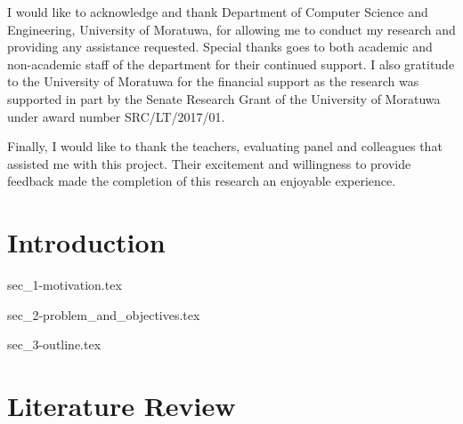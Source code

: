 \documentclass[a4paper,oneside,12pt]{report}
\begin{document}
I would like to acknowledge and thank Department of Computer Science and Engineering, University of Moratuwa, for allowing me to conduct my research and providing any assistance requested. Special thanks goes to both academic and non-academic staff of the department for their continued support. I also gratitude to the University of Moratuwa for the financial support as the research was supported in part by the Senate Research Grant of the University of Moratuwa under award number SRC/LT/2017/01.

Finally, I would like to thank the teachers, evaluating panel and colleagues that assisted me with this project. Their excitement and willingness to provide feedback made the completion of this research an enjoyable experience.

\tableofcontents

\listoffigures

\listoftables


\printglossary[style=custom-glossary-style, type=\acronymtype, title=List of Abbreviations, toctitle=List of Abbreviations, nonumberlist]

\chapter{Introduction}
\label{ch:intro}

{sec_1-motivation.tex}

{sec_2-problem_and_objectives.tex}

{sec_3-outline.tex}

\chapter{Literature Review}
\label{ch:literature}
\end{document}
